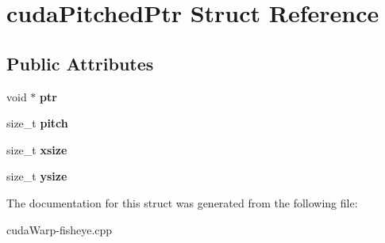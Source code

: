 \hypertarget{structcudaPitchedPtr}{}\section{cuda\+Pitched\+Ptr Struct Reference}
\label{structcudaPitchedPtr}
\subsection*{Public Attributes}
\begin{DoxyCompactItemize}
\item 
void $\ast$ {\bfseries ptr}\hypertarget{structcudaPitchedPtr_a6a1476538c1f4bf7b9cad0304b91d5cf}{}\label{structcudaPitchedPtr_a6a1476538c1f4bf7b9cad0304b91d5cf}

\item 
size\+\_\+t {\bfseries pitch}\hypertarget{structcudaPitchedPtr_a412fba6b15962413c9f586c3a1ecb69b}{}\label{structcudaPitchedPtr_a412fba6b15962413c9f586c3a1ecb69b}

\item 
size\+\_\+t {\bfseries xsize}\hypertarget{structcudaPitchedPtr_a968ee390e4d40600399dceb8bbcac0f1}{}\label{structcudaPitchedPtr_a968ee390e4d40600399dceb8bbcac0f1}

\item 
size\+\_\+t {\bfseries ysize}\hypertarget{structcudaPitchedPtr_a69b55825344e26692ef5352262f2e112}{}\label{structcudaPitchedPtr_a69b55825344e26692ef5352262f2e112}

\end{DoxyCompactItemize}


The documentation for this struct was generated from the following file\+:\begin{DoxyCompactItemize}
\item 
cuda\+Warp-\/fisheye.\+cpp\end{DoxyCompactItemize}
